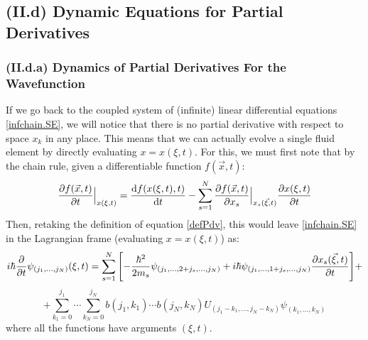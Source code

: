 \documentclass[11pt, a4paper]{article} %
\begin{document}

\subsection*{(II.d) Dynamic Equations for Partial Derivatives}\vspace{-0.2cm}


\subsubsection*{(II.d.a) Dynamics of Partial Derivatives For the Wavefunction}\vspace{-0.1cm}

If we go back to the coupled system of (infinite) linear differential equations \eqref{infchain.SE}, we will notice that there is no partial derivative with respect to space $x_k$ in any place. This means that we can actually evolve a single fluid element by directly evaluating $x=x(\xi,t)$. For this, we must first note that by the chain rule, given a differentiable function $f(\vec{x},t)$:
\begin{equation}\label{ruler}
\pdv{f(\vec{x},t)}{t}\Big\rvert_{x(\xi,t)} = \dv{f(x(\xi,t),t)}{t}-\sum_{s=1}^N \pdv{f(\vec{x},t)}{x_s}\Big\rvert_{x_s(\vec{\xi},t)}\pdv{x(\xi,t)}{t}
\end{equation}
Then, retaking the definition of equation \eqref{defPdv}, this would leave \eqref{infchain.SE} in the Lagrangian frame (evaluating $x=x(\xi,t)$) as:\vspace{-0.1cm}
\begin{equation}\label{infchain.SE.L}
i\hbar \pdv{}{t}\psi_{(j_1,...,j_N)}(\xi,t)=\sum_{s=1}^N\qty[-\frac{\hbar^2}{2m_s}\psi_{(j_1,...,2+j_s,...,j_N)}+i\hbar \psi_{(j_1,...,1+j_s,...,j_N)} \pdv{x_s(\vec{\xi},t)}{t}]+\vspace{-0.1cm}
\end{equation}
$$
+\sum_{k_1=0}^{j_1}\cdots\sum_{k_N=0}^{j_N} b(j_1,k_1)\cdots b(j_N,k_N)U_{(j_1-k_1,...,j_N-k_N)}\psi_{(k_1,...,k_N)}
$$
where all the functions have arguments $(\xi,t)$.
\end{document}
